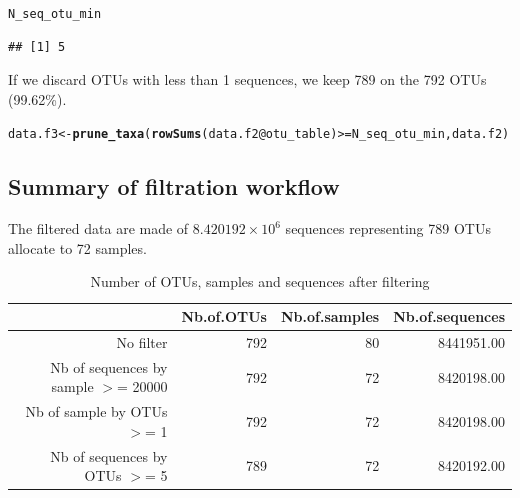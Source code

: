 \documentclass[12pt]{article}\usepackage[]{graphicx}\usepackage[]{color}
\makeatletter
\newcommand{\hlopt}[1]{\textcolor[rgb]{0,0,0}{#1}}%
\newcommand{\hlstd}[1]{\textcolor[rgb]{0.345,0.345,0.345}{#1}}%
\newcommand{\hlkwb}[1]{\textcolor[rgb]{0.69,0.353,0.396}{#1}}%
\newcommand{\hlkwc}[1]{\textcolor[rgb]{0.333,0.667,0.333}{#1}}%
\newcommand{\hlkwd}[1]{\textcolor[rgb]{0.737,0.353,0.396}{\textbf{#1}}}%
\newenvironment{kframe}{%
 \def\at@end@of@kframe{}%
 \ifinner\ifhmode%
  \def\at@end@of@kframe{\end{minipage}}%
  \begin{minipage}{\columnwidth}%
 \fi\fi%
 \def\FrameCommand##1{\hskip\@totalleftmargin \hskip-\fboxsep
 \colorbox{shadecolor}{##1}\hskip-\fboxsep
     \hskip-\linewidth \hskip-\@totalleftmargin \hskip\columnwidth}%
 \MakeFramed {\advance\hsize-\width
   \@totalleftmargin\z@ \linewidth\hsize
   \@setminipage}}%
 {\par\unskip\endMakeFramed%
 \at@end@of@kframe}
\newenvironment{knitrout}{}{} %
\numberwithin{figure}{section}
\makeatother
\begin{document}
\begin{knitrout}\small
{}\color{fgcolor}\begin{kframe}
\begin{alltt}
\hlstd{N_seq_otu_min}
\end{alltt}
\begin{verbatim}
## [1] 5
\end{verbatim}
\end{kframe}
\end{knitrout}

If we discard OTUs with less than 1 sequences, we keep 789 on the 792 OTUs (99.62\%).

\begin{knitrout}\small
{}\color{fgcolor}\begin{kframe}
\begin{alltt}
\hlstd{data.f3} \hlkwb{<-} \hlkwd{prune_taxa}\hlstd{(}\hlkwd{rowSums}\hlstd{(data.f2}\hlopt{@}\hlkwc{otu_table}\hlstd{)} \hlopt{>=} \hlstd{N_seq_otu_min, data.f2)}
\end{alltt}
\end{kframe}
\end{knitrout}

\subsection{Summary of filtration workflow}

The filtered data are made of \ensuremath{8.420192\times 10^{6}} sequences representing 789 OTUs allocate to 72 samples.




\begin{table}[ht]
\centering
\begin{tabular}{rrrr}
  \hline
 & Nb.of.OTUs & Nb.of.samples & Nb.of.sequences \\ 
  \hline
No filter & 792 &  80 & 8441951.00 \\ 
  Nb of sequences by sample $>$=  20000 & 792 &  72 & 8420198.00 \\ 
  Nb of sample by OTUs $>$=  1 & 792 &  72 & 8420198.00 \\ 
  Nb of sequences by OTUs $>$=  5 & 789 &  72 & 8420192.00 \\ 
   \hline
\end{tabular}
\caption{Number of OTUs, samples and sequences after filtering} 
\end{table}
\end{document}
